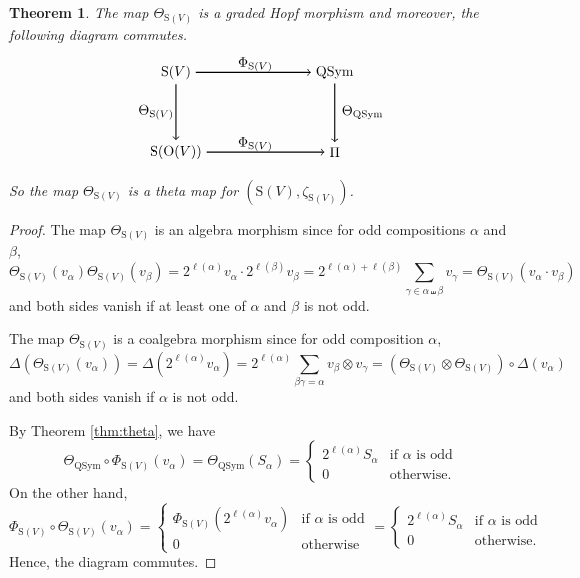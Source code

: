 \documentclass[12pt]{amsart}
\newtheorem{theorem}{Theorem}[section]
\numberwithin{equation}{section}
\newcommand{\QSym}{\mathrm{QSym}}
\newcommand{\rmO}{\mathrm{O}}
\newcommand{\rmS}{\mathrm{S}}
\begin{document}
\begin{theorem}\label{thm:odd-shuffle}
	The map $\Theta_{\rmS(V)}$ is a graded Hopf morphism and moreover, the following diagram commutes. 
	$$
	\begin{tikzpicture}
	\node(TV) at (0,0){$\rmS(V)$};
	\node(Sym) at (4,0){$\QSym$};
	\node(OV) at (0,-2){$\rmS(\rmO(V))$};
	\node(Omega) at (4,-2){$\Pi$};
	
	\draw[thick,->]  (TV)->(Sym);
	\draw[thick,->]  (OV)->(Omega);
	\draw[thick,->]   (TV)->(OV);
	\draw[thick,->]   (Sym)->(Omega);
	
	\node(Phi) at (2,0.2){$\Phi_{\rmS(V)}$};
	\node(Phi) at (2,-1.8){$\Phi_{\rmS(V)}$};
	\node(thetaV) at (-0.5,-1){$\Theta_{\rmS(V)}$};
	\node(thetaV) at (4.7,-1){$\Theta_\QSym$};
	\end{tikzpicture} 
	$$
	So the map $\Theta_{\rmS(V)}$ is a theta map for $(\rmS(V),\zeta_{\rmS(V)})$.
\end{theorem} 

\begin{proof}
	The map $\Theta_{\rmS(V)}$ is an algebra morphism since for odd compositions $\alpha$ and $\beta$,
	$$\Theta_{\rmS(V)}(v_\alpha)\Theta_{\rmS(V)}(v_\beta)=2^{\ell(\alpha)}v_\alpha\cdot2^{\ell(\beta)} v_\beta=2^{\ell(\alpha)+\ell(\beta)}\sum_{\gamma\in\alpha\shuffle\beta}v_{\gamma}=\Theta_{\rmS(V)}(v_\alpha\cdot v_\beta)$$
	and both sides vanish if at least one of $\alpha$ and $\beta$ is not odd.
	
	The map $\Theta_{\rmS(V)}$ is a coalgebra morphism since for odd composition $\alpha$,
	$$\Delta(\Theta_{\rmS(V)}(v_\alpha))=\Delta\left(2^{\ell(\alpha)}v_\alpha\right)=2^{\ell(\alpha)}\sum_{\beta\gamma=\alpha}v_{\beta}\otimes v_{\gamma}=\left(\Theta_{\rmS(V)}\otimes\Theta_{\rmS(V)}\right)\circ\Delta(v_\alpha)$$
	and both sides vanish if $\alpha$ is not odd.
	
	By Theorem \ref{thm:theta}, we have
	$$\Theta_\QSym\circ \Phi_{\rmS(V)}(v_\alpha)=\Theta_\QSym(S_\alpha)=\left\{\begin{array}{cc}
	2^{\ell(\alpha)}S_\alpha & \text{if }\alpha \text{ is odd}\\
	0& \text{otherwise.}
	\end{array}\right.$$
	On the other hand,
	$$\Phi_{\rmS(V)}\circ\Theta_{\rmS(V)}(v_\alpha)=\left\{\begin{array}{cc}
	\Phi_{\rmS(V)}\left(2^{\ell(\alpha)}v_\alpha\right) & \text{if }\alpha \text{ is odd}\\
	0& \text{otherwise}
	\end{array}\right.=\left\{\begin{array}{cc}
	2^{\ell(\alpha)}S_\alpha & \text{if }\alpha \text{ is odd}\\
	0& \text{otherwise.}
	\end{array}\right.$$
	Hence, the diagram commutes.
\end{proof}
\end{document}

